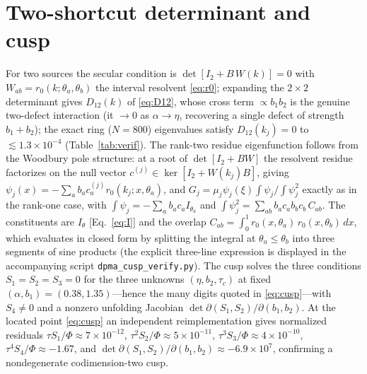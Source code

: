 \documentclass[reprint,amsmath,amssymb,aps,prresearch,longbibliography]{revtex4-2}
\begin{document}
\section{Two-shortcut determinant and cusp}\label{app:cusp}
For two sources the secular condition is $\det[I_2+B\,W(k)]=0$ with $W_{ab}=r_0(k;\theta_a,\theta_b)$
the interval resolvent \eqref{eq:r0}; expanding the $2\times2$ determinant gives $D_{12}(k)$ of
\eqref{eq:D12}, whose cross term $\propto b_1b_2$ is the genuine two-defect interaction (it $\to0$ as
$\alpha\to\eta$, recovering a single defect of strength $b_1+b_2$); the exact ring ($N=800$)
eigenvalues satisfy $D_{12}(k_j)=0$ to $\lesssim1.3\times10^{-4}$ (Table~\ref{tab:verif}). The rank-two residue
eigenfunction follows from the Woodbury pole structure: at a root of $\det[I_2+BW]$ the resolvent
residue factorizes on the null vector
$c^{(j)}\in\ker[I_2+W(k_j)B]$, giving $\psi_j(x)=-\sum_a b_a c_a^{(j)}r_0(k_j;x,\theta_a)$,
and $G_j=\mu_j\psi_j(\xi)\int\psi_j/\int\psi_j^2$ exactly as in the rank-one case, with
$\int\psi_j=-\sum_a b_a c_a I_{\theta_a}$ and $\int\psi_j^2=\sum_{ab}b_a c_a b_b c_b\,C_{ab}$. The
constituents are $I_\theta$ [Eq.~\eqref{eq:I}] and the overlap
$C_{ab}=\int_0^1 r_0(x,\theta_a)\,r_0(x,\theta_b)\,dx$, which evaluates in closed form by splitting
the integral at $\theta_a\le\theta_b$ into three segments of sine products (the explicit three-line
expression is displayed in the accompanying script \texttt{dpma\_cusp\_verify.py}). The cusp solves the
three conditions
$S_1=S_2=S_3=0$ for the three unknowns $(\eta,b_2,\tau_c)$ at fixed $(\alpha,b_1)=(0.38,1.35)$---hence
the many digits quoted in \eqref{eq:cusp}---with $S_4\neq0$ and a nonzero unfolding Jacobian
$\det\partial(S_1,S_2)/\partial(b_1,b_2)$. At the located point \eqref{eq:cusp} an independent
reimplementation gives normalized residuals $\tau S_1/\Phi\approx7\times10^{-12}$,
$\tau^2S_2/\Phi\approx5\times10^{-11}$, $\tau^3S_3/\Phi\approx4\times10^{-10}$,
$\tau^4S_4/\Phi\approx-1.67$, and $\det\partial(S_1,S_2)/\partial(b_1,b_2)\approx-6.9\times10^7$,
confirming a nondegenerate codimension-two cusp.
\end{document}
